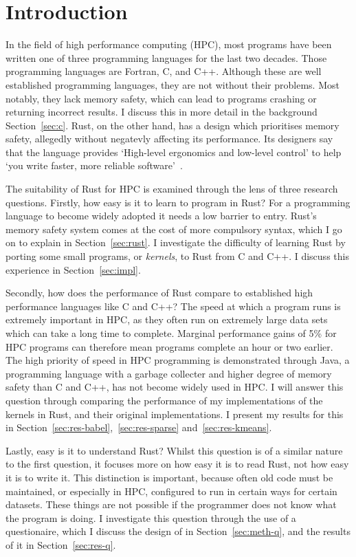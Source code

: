 \chapter{Introduction}
In the field of high performance computing (HPC), most programs have been written one of three programming languages for the last two decades. Those programming languages are Fortran, C, and C++. Although these are well established programming languages, they are not without their problems. Most notably, they lack memory safety, which can lead to programs crashing or returning incorrect results. I discuss this in more detail in the background Section~\ref{sec:c}. Rust, on the other hand, has a design which prioritises memory safety, allegedly without negatevly affecting its performance. 
Its designers say that the language provides `High-level ergonomics and low-level control' to help `you write faster, more reliable software'~\cite{RustBook}.

The suitability of Rust for HPC is examined through the lens of three research questions. Firstly, how easy is it to learn to program in Rust? For a programming language to become widely adopted it needs a low barrier to entry. Rust's memory safety system comes at the cost of more compulsory syntax, which I go on to explain in Section~\ref{sec:rust}. I investigate the difficulty of learning Rust by porting some small programs, or {\em kernels}, to Rust from C and C++. I discuss this experience in Section~\ref{sec:impl}.

Secondly, how does the performance of Rust compare to established high performance languages like C and C++?
The speed at which a program runs is extremely important in HPC, as they often run on extremely large data sets which can take a long time to complete. Marginal performance gains of 5\% for HPC programs can therefore mean programs complete an hour or two earlier.
The high priority of speed in HPC programming is demonstrated through Java, a programming language with a garbage collecter and higher degree of memory safety than C and C++, has not become widely used in HPC\@. I will answer this question through comparing the performance of my implementations of the kernels in Rust, and their original implementations. I present my results for this in Section~\ref{sec:res-babel},~\ref{sec:res-sparse} and~\ref{sec:res-kmeans}.

Lastly, easy is it to understand Rust? Whilst this question is of a similar nature to the first question, it focuses more on how easy it is to read Rust, not how easy it is to write it. This distinction is important, because often old code must be maintained, or especially in HPC, configured to run in certain ways for certain datasets. These things are not possible if the programmer does not know what the program is doing. I investigate this question through the use of a questionaire, which I discuss the design of in Section~\ref{sec:meth-q}, and the results of it in Section~\ref{sec:res-q}.

